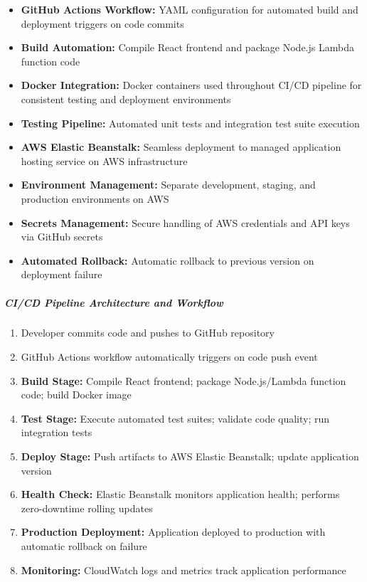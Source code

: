 \begin{itemize}
    \item \textbf{GitHub Actions Workflow:} YAML configuration for automated build and deployment triggers on code commits
    \item \textbf{Build Automation:} Compile React frontend and package Node.js Lambda function code
    \item \textbf{Docker Integration:} Docker containers used throughout CI/CD pipeline for consistent testing and deployment environments
    \item \textbf{Testing Pipeline:} Automated unit tests and integration test suite execution
    \item \textbf{AWS Elastic Beanstalk:} Seamless deployment to managed application hosting service on AWS infrastructure  
    \item \textbf{Environment Management:} Separate development, staging, and production environments on AWS
    \item \textbf{Secrets Management:} Secure handling of AWS credentials and API keys via GitHub secrets
    \item \textbf{Automated Rollback:} Automatic rollback to previous version on deployment failure
\end{itemize}

\subparagraph{CI/CD Pipeline Architecture and Workflow}

\begin{enumerate}
    \item Developer commits code and pushes to GitHub repository
    \item GitHub Actions workflow automatically triggers on code push event
    \item \textbf{Build Stage:} Compile React frontend; package Node.js/Lambda function code; build Docker image
    \item \textbf{Test Stage:} Execute automated test suites; validate code quality; run integration tests
    \item \textbf{Deploy Stage:} Push artifacts to AWS Elastic Beanstalk; update application version
    \item \textbf{Health Check:} Elastic Beanstalk monitors application health; performs zero-downtime rolling updates
    \item \textbf{Production Deployment:} Application deployed to production with automatic rollback on failure
    \item \textbf{Monitoring:} CloudWatch logs and metrics track application performance
\end{enumerate}

